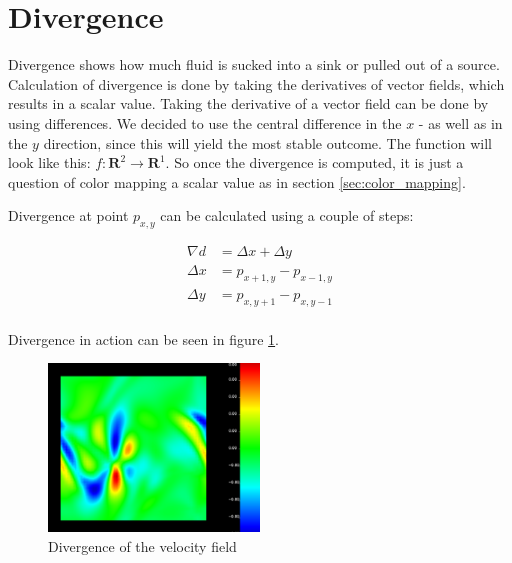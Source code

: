 \section{Divergence}
\label{sec:divergence}
Divergence shows how much fluid is sucked into a sink or pulled out of a source. 
Calculation of divergence is done by taking the derivatives of vector fields, which results in a scalar value.
Taking the derivative of a vector field can be done by using differences.
We decided to use the central difference in the $x$ - as well as in the $y$ direction, since this will yield the most stable outcome. 
The function will look like this:  $f:\mathbf{R}^2 \rightarrow \mathbf{R}^1$.
So once the divergence is computed, it is just a question of color mapping a scalar value as in section \ref{sec:color_mapping}.

Divergence at point $p_{x,y}$ can be calculated using a couple of steps:

\begin{equation*}
\begin{aligned}
\nabla d &= \Delta x + \Delta y \\
\Delta x &= p_{x+1,y} - p_{x-1,y} \\
\Delta y &= p_{x,y+1} - p_{x,y-1} \\
\end{aligned}
\end{equation*}

Divergence in action can be seen in figure \ref{fig:div_velo}.
\begin{figure}[htb]
    \centering
    \includegraphics[width =0.5\textwidth]{content/pictures/div_velo.png}
    \caption{Divergence of the velocity field}
    \label{fig:div_velo}
\end{figure}

